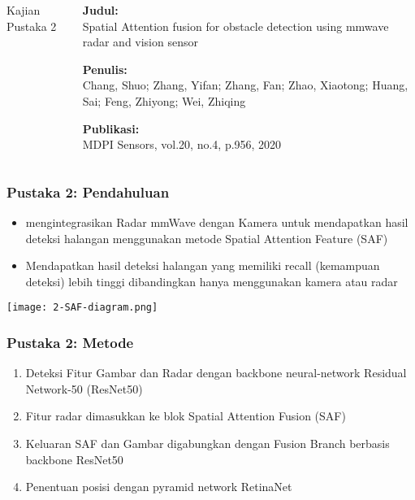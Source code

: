 
\begin{frame}
    \begin{columns}
        \begin{column}{0.35\textwidth}
            \LARGE
            Kajian Pustaka 2
        \end{column}
        \begin{column}{0.6\textwidth}
            \justifying
            \textbf{Judul:}\\
            Spatial Attention fusion for obstacle detection using mmwave radar and vision sensor

            \vspace{1.5em}

            \textbf{Penulis:}\\
            Chang, Shuo; Zhang, Yifan; Zhang, Fan; Zhao, Xiaotong; Huang, Sai; Feng, Zhiyong; Wei, Zhiqing

            \vspace{1.5em}
            
            \textbf{Publikasi:}\\
            MDPI Sensors, vol.20, no.4, p.956, 2020
        \end{column}
    \end{columns}
\end{frame}


\begin{frame}
    \frametitle{Pustaka 2: Pendahuluan}
    \large
    \begin{itemize}
        \justifying
        \item mengintegrasikan Radar mmWave dengan Kamera untuk mendapatkan hasil deteksi halangan menggunakan metode Spatial Attention Feature (SAF)
        \vspace{1em}
        \item Mendapatkan hasil deteksi halangan yang memiliki recall (kemampuan deteksi) lebih tinggi dibandingkan hanya menggunakan kamera atau radar
    \end{itemize}
\end{frame}


\begin{frame}
    \centering
    \texttt{[image: 2-SAF-diagram.png]}
\end{frame}


\begin{frame}
    \frametitle{Pustaka 2: Metode}
    \begin{enumerate}
        \justifying
        \item Deteksi Fitur Gambar dan Radar dengan backbone neural-network Residual Network-50 (ResNet50)
        \item Fitur radar dimasukkan ke blok Spatial Attention Fusion (SAF)
        \item Keluaran SAF dan Gambar digabungkan dengan Fusion Branch berbasis backbone ResNet50
        \item Penentuan posisi dengan pyramid network RetinaNet
    \end{enumerate}
\end{frame}


